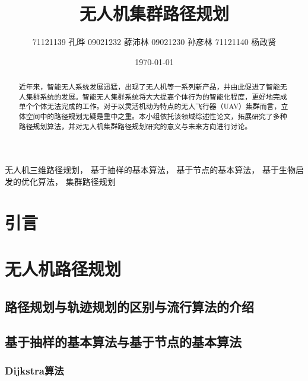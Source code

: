\documentclass[conference]{IEEEtran}
\title{无人机集群路径规划}
\author{71121139 孔晔
    09021232 薛沛林
    09021230 孙彦林
    71121140 杨政贤}
\date{\today}
\begin{document}
\maketitle


\begin{abstract}

    近年来，智能无人系统发展迅猛，出现了无人机等一系列新产品，并由此促进了智能无人集群系统的发展。智能无人集群系统将大大提高个体行为的智能化程度，更好地完成单个个体无法完成的工作。对于以灵活机动为特点的无人飞行器（UAV）集群而言，立体空间中的路径规划无疑是重中之重。本小组依托该领域综述性论文，拓展研究了多种路径规划算法，并对无人机集群路径规划研究的意义与未来方向进行讨论。

\end{abstract}



\begin{IEEEkeywords}

    无人机三维路径规划，
    基于抽样的基本算法，
    基于节点的基本算法，
    基于生物启发的优化算法，
    集群路径规划

\end{IEEEkeywords}

\section{引言}



\section{无人机路径规划}


\subsection{路径规划与轨迹规划的区别与流行算法的介绍}


\subsection{基于抽样的基本算法与基于节点的基本算法}

\subsubsection{Dijkstra算法}
\end{document}
